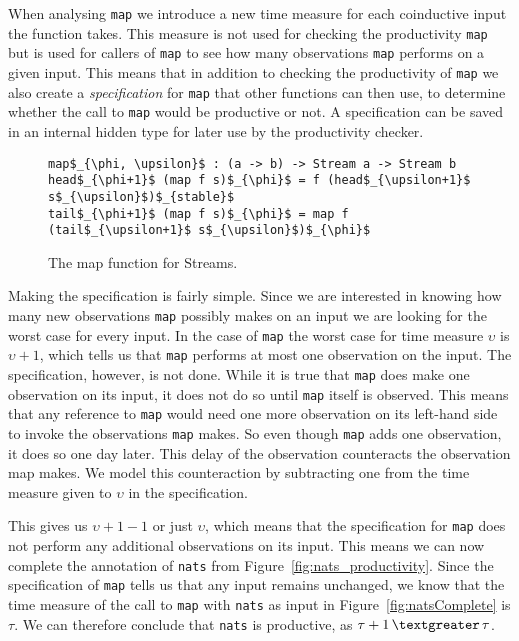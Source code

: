 When analysing \texttt{map} we introduce a new time measure for each coinductive input the function takes. This measure is not used for checking the productivity \texttt{map} but is used for callers of \texttt{map} to see how many observations \texttt{map} performs on a given input. This means that in addition to checking the productivity of \texttt{map} we also create a \textit{specification} for \texttt{map} that other functions can then use, to determine whether the call to \texttt{map} would be productive or not. A specification can be saved in an internal hidden type for later use by the productivity checker.

\begin{figure}
\begin{Verbatim}[commandchars=\\\{\},codes={\catcode`$=3\catcode`_=8}]
map$_{\phi, \upsilon}$ : (a -> b) -> Stream a -> Stream b
head$_{\phi+1}$ (map f s)$_{\phi}$ = f (head$_{\upsilon+1}$ s$_{\upsilon}$)$_{stable}$
tail$_{\phi+1}$ (map f s)$_{\phi}$ = map f (tail$_{\upsilon+1}$ s$_{\upsilon}$)$_{\phi}$
\end{Verbatim}
\caption{The map function for Streams.}
\label{fig:map}
\end{figure}

Making the specification is fairly simple. Since we are interested in knowing how many new observations \texttt{map} possibly makes on an input we are looking for the worst case for every input. In the case of \texttt{map} the worst case for time measure $\upsilon$ is $\upsilon+1$, which tells us that \texttt{map} performs at most one observation on the input. The specification, however, is not done. While it is true that \texttt{map} does make one observation on its input, it does not do so until \texttt{map} itself is observed. This means that any reference to \texttt{map} would need one more observation on its left-hand side to invoke the observations \texttt{map} makes. So even though \texttt{map} adds one observation, it does so one day later. This delay of the observation counteracts the observation map makes. We model this counteraction by subtracting one from the time measure given to $\upsilon$ in the specification.

This gives us $\upsilon+1-1$ or just $\upsilon$, which means that the specification for \texttt{map} does not perform any additional observations on its input. This means we can now complete the annotation of \texttt{nats} from Figure~\ref{fig:nats_productivity}. Since the specification of \texttt{map} tells us that any input remains unchanged, we know that the time measure of the call to \texttt{map} with \texttt{nats} as input in Figure~\ref{fig:natsComplete} is $\tau$. We can therefore conclude that \texttt{nats} is productive, as $\tau+1\,\textgreater\,\tau$.

